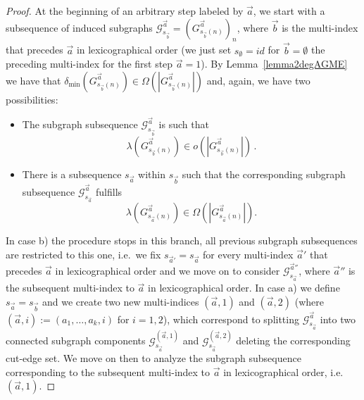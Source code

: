 \documentclass[a4paper,onecolumn,accepted=2024-12-14]{quantumarticle}
\theoremstyle{plain}
\newcommand{\cG}{{\mathcal G}}         %
\begin{document}
\begin{proof}
At the beginning of an arbitrary step labeled by $\vec{a}$, we start with a subsequence of induced subgraphs $\cG_{s_{\vec{b}}}^{\vec{a}}=(G_{s_{\vec{b}}(n)}^{\vec{a}})_n$, where $\vec{b}$ is the multi-index that precedes $\vec{a}$ in lexicographical order (we just set $s_{\emptyset}=id$ for $\vec{b}=\emptyset$ the preceding multi-index for the first step $\vec{a}=1$). By Lemma~\ref{lemma2degAGME} we have that
$\delta_{\mathrm{min}}(G_{s_{\vec{b}}(n)}^{\vec{a}}) \in\Omega(|G_{s_{\vec{b}}(n)}^{\vec{a}}|)$ and, again, we have two possibilities:
\begin{itemize}
    \item[a)] The subgraph subsequence $\cG^{\vec{a}}_{s_{\vec{b}}}$ is such that
\begin{equation}
\lambda\left(G_{s_{\vec{b}}(n)}^{\vec{a}}\right)\in o\left(|G_{s_{\vec{b}}(n)}^{\vec{a}}|\right)\,.
\end{equation}

\item[b)] There is a subsequence $s_{\vec{a}}$ within $s_{\vec{b}}$ such that the corresponding subgraph subsequence $\cG^{\vec{a}}_{s_{\vec{a}}}$ fulfills
\begin{equation}
\lambda\left(G_{s_{\vec{a}}(n)}^{\vec{a}}\right)
\in\Omega\left(|G_{s_{\vec{a}}(n)}^{\vec{a}}|\right).
\end{equation}
\end{itemize}
In case b) the procedure stops in this branch, all previous subgraph subsequences are
restricted to this one, i.e.\ we fix $s_{\vec{a}'}=s_{\vec{a}}$ for every multi-index
$\vec{a}'$ that precedes $\vec{a}$ in lexicographical order and we move on to consider
$\cG^{\vec{a}''}_{s_{\vec{a}}}$, where $\vec{a}''$ is the subsequent multi-index to
$\vec{a}$ in lexicographical order. In case a) we define $s_{\vec{a}}=s_{\vec{b}}$ and we create two new multi-indices $(\vec{a},1)$ and $(\vec{a},2)$ (where $(\vec{a},i):=(a_1,\dots,a_k,i)$ for $i=1,2$), which correspond to splitting $\cG_{s_{\vec{a}}}^{\vec{a}}$ into two connected subgraph components $\cG_{s_{\vec{a}}}^{(\vec{a},1)}$ and $\cG_{s_{\vec{a}}}^{(\vec{a},2)}$ deleting the corresponding cut-edge set. We move on then to analyze the subgraph subsequence corresponding to the subsequent multi-index to $\vec{a}$ in lexicographical order, i.e.\ $(\vec{a},1)$.


\end{proof}
\end{document}
